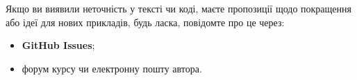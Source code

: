 
Якщо ви виявили неточність у тексті чи коді, маєте пропозиції щодо покращення або ідеї для нових прикладів, будь ласка, повідомте про це через:
\begin{itemize}
    \item \textbf{GitHub Issues};
    \item форум курсу чи електронну пошту автора.
\end{itemize}

%
%
%
%
%


